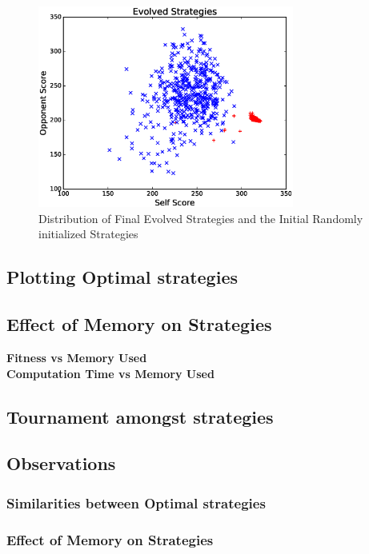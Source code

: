 \documentclass[a4paper]{article}
\begin{document}
	\begin{figure}[H]
	\centering
	\includegraphics[width=0.75\textwidth]{evolvePlot.eps}
	\caption{{Distribution of Final Evolved Strategies and the Initial Randomly initialized Strategies}}
	\end{figure}

	\subsection{Plotting Optimal strategies}

	\subsection{Effect of Memory on Strategies}
	
	\textbf{Fitness vs Memory Used}\\
	\textbf{Computation Time vs Memory Used}
	
	\subsection{Tournament amongst strategies}
	
	\subsection{Observations}

	\subsubsection{Similarities between Optimal strategies}
	
	\subsubsection{Effect of Memory on Strategies}	
\end{document}
